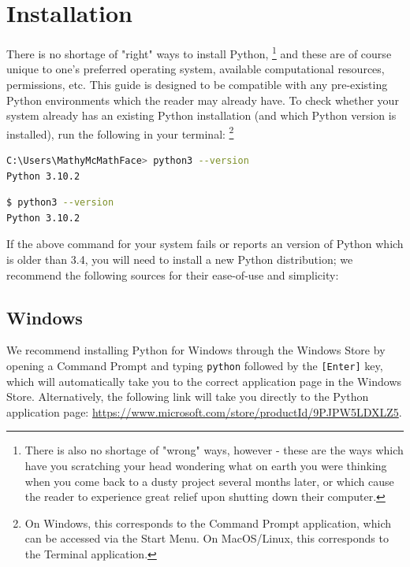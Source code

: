 \documentclass[12pt]{article}
\begin{document}
\section{Installation}\label{sec:installation}

There is no shortage of "right" ways to install Python, \footnote{There is also no shortage of "wrong" ways, however
- these are the ways which have you scratching your head wondering what on earth you were thinking when you come back
to a dusty project several months later, or which cause the reader to experience great relief upon shutting down their
computer.} and these are of course unique to one's preferred operating system, available computational resources, 
permissions, etc. This guide is designed to be compatible with any pre-existing Python environments which the reader
may already have. To check whether your system already has an existing Python installation (and which Python version is 
installed), run the following in your terminal: \footnote{
    On Windows, this corresponds to the Command Prompt application, which can be accessed via the Start Menu. On
    MacOS/Linux, this corresponds to the Terminal application.
}

\begin{lstlisting}[language=bash, caption=Python Version (Windows)]
C:\Users\MathyMcMathFace> python3 --version
Python 3.10.2
\end{lstlisting}

\begin{lstlisting}[language=bash, caption=Python Version (MacOS/Linux)]
$ python3 --version
Python 3.10.2
\end{lstlisting}

If the above command for your system fails or reports an version of Python which is older than 3.4, you will need to install a 
new Python distribution; we recommend the following sources for their ease-of-use and simplicity:

\subsection{Windows}\label{sec:installation-windows}

We recommend installing Python for Windows through the Windows Store by opening a Command Prompt and 
typing \texttt{python} followed by the \texttt{[Enter]} key, which will automatically take you to
the correct application page in the Windows Store. Alternatively, the following
link will take you directly to the Python application page:
\url{https://www.microsoft.com/store/productId/9PJPW5LDXLZ5}.
\end{document}
